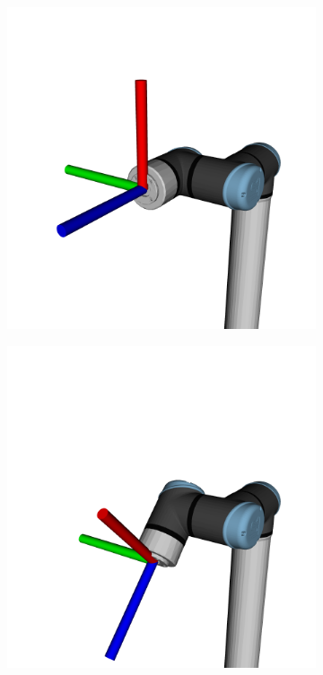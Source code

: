 \begin{figure}[h]
\begin{subfigure}{.195\linewidth}
      \label{fig:eef_p2}
    \end{subfigure}
    \begin{subfigure}{.195\linewidth}
        \centering
        \includegraphics[width=\linewidth]{figs/chp3/P3.png}
        \label{fig:eef_p3}
    \end{subfigure}
    \begin{subfigure}{.195\linewidth}
        \centering
        \includegraphics[width=\linewidth]{figs/chp3/P4.png}

\end{subfigure}
\end{figure}
